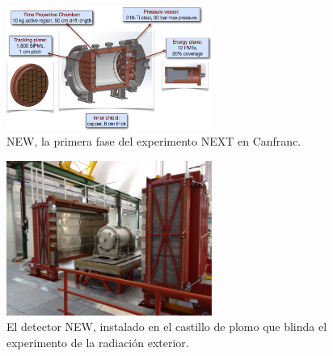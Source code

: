 \begin{figure}
\centering
\includegraphics[width=0.6\textwidth]{img/NEW.png}
\caption{\small NEW, la primera fase del experimento NEXT en Canfranc.} \label{fig:NEW}
\end{figure} 

\begin{figure}
\centering

\includegraphics[width=0.6\textwidth]{img/NewCastle.png}
\caption{\small El detector NEW, instalado en el castillo de plomo que blinda el experimento de la radiación exterior.} \label{fig.NewCastle}
\end{figure} 

